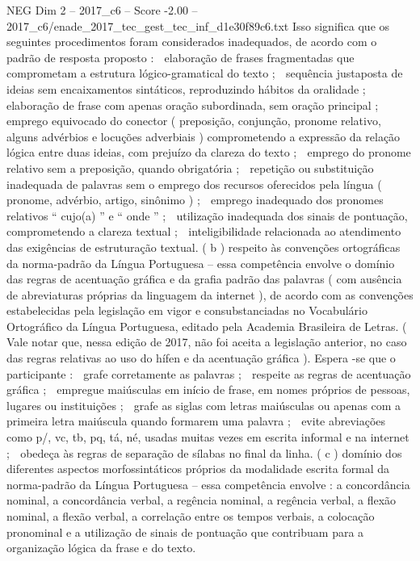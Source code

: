 \begin{textsample}{NEG Dim 2 – 2017\_c6 – Score -2.00 – 2017\_c6/enade\_2017\_tec\_gest\_tec\_inf\_d1e30f89c6.txt}
Isso significa que os seguintes procedimentos foram considerados inadequados, de acordo com o padrão de resposta proposto :  elaboração de frases fragmentadas que comprometam a estrutura lógico-gramatical do texto ;  sequência justaposta de ideias sem encaixamentos sintáticos, reproduzindo hábitos da oralidade ;  elaboração de frase com apenas oração subordinada, sem oração principal ;  emprego equivocado do conector ( preposição, conjunção, pronome relativo, alguns advérbios e locuções adverbiais ) comprometendo a expressão da relação lógica entre duas ideias, com prejuízo da clareza do texto ;  emprego do pronome relativo sem a preposição, quando obrigatória ;  repetição ou substituição inadequada de palavras sem o emprego dos recursos oferecidos pela língua ( pronome, advérbio, artigo, sinônimo ) ;  emprego inadequado dos pronomes relativos “ cujo(a) ” e “ onde ” ;  utilização inadequada dos sinais de pontuação, comprometendo a clareza textual ;  inteligibilidade relacionada ao atendimento das exigências de estruturação textual. ( b ) respeito às convenções ortográficas da norma-padrão da Língua Portuguesa – essa competência envolve o domínio das regras de acentuação gráfica e da grafia padrão das palavras ( com ausência de abreviaturas próprias da linguagem da internet ), de acordo com as convenções estabelecidas pela legislação em vigor e consubstanciadas no Vocabulário Ortográfico da Língua Portuguesa, editado pela Academia Brasileira de Letras. ( Vale notar que, nessa edição de 2017, não foi aceita a legislação anterior, no caso das regras relativas ao uso do hífen e da acentuação gráfica ).
Espera -se que o participante :  grafe corretamente as palavras ;  respeite as regras de acentuação gráfica ;  empregue maiúsculas em início de frase, em nomes próprios de pessoas, lugares ou instituições ;  grafe as siglas com letras maiúsculas ou apenas com a primeira letra maiúscula quando formarem uma palavra ;  evite abreviações como p/, vc, tb, pq, tá, né, usadas muitas vezes em escrita informal e na internet ;  obedeça às regras de separação de sílabas no final da linha. ( c ) domínio dos diferentes aspectos morfossintáticos próprios da modalidade escrita formal da norma-padrão da Língua Portuguesa – essa competência envolve : a concordância nominal, a concordância verbal, a regência nominal, a regência verbal, a flexão nominal, a flexão verbal, a correlação entre os tempos verbais, a colocação pronominal e a utilização de sinais de pontuação que contribuam para a organização lógica da frase e do texto.

\end{textsample}

